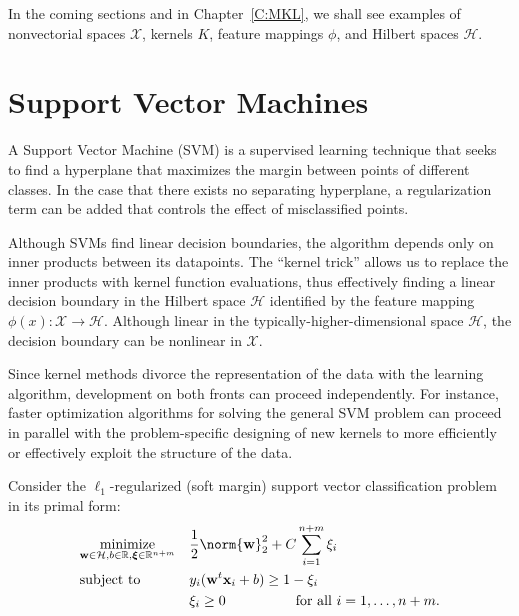 In the coming sections and in Chapter~\ref{C:MKL}, we shall see examples of
nonvectorial spaces $\mathcal{X}$, kernels $K$, feature mappings $\phi$, and
Hilbert spaces $\mathcal{H}$.

\section{Support Vector Machines}
A Support Vector Machine (SVM) \cite{cortes1995support} is a supervised learning
technique that seeks to find a hyperplane that maximizes the margin between
points of different classes.  In the case that there exists no separating
hyperplane, a regularization term can be added that controls the effect of
misclassified points.

Although SVMs find linear decision boundaries,
the algorithm depends only on inner products between its datapoints.  The
``kernel trick'' \cite{aizerman1964theoretical} allows us to replace the
inner products with kernel function evaluations, thus effectively finding
a linear decision boundary in the Hilbert space $\mathcal{H}$ identified by
the feature mapping $\phi(x): \mathcal{X} \to \mathcal{H}$.  Although linear
in the typically-higher-dimensional space $\mathcal{H}$, the decision boundary
can be nonlinear in $\mathcal{X}$.

Since kernel methods divorce the representation of the data with the learning
algorithm, development on both fronts can proceed independently.  For instance,
faster optimization algorithms for solving the general SVM problem can proceed
in parallel with the problem-specific designing of new kernels to more efficiently
or effectively exploit the structure of the data.

Consider the $\ell_1$-regularized (soft margin) support vector classification
problem \cite{scholkopf2002learning} in its primal form:
\begin{equation}
\label{eq:l1-svm-primal}
\begin{aligned}
& \underset{\mathbf{w} \in \mathcal{H}, b \in \mathbb{R}, {\boldsymbol \xi} \in \mathbb{R}^{n+m}}{\text{minimize}}
& &\frac{1}{2}\norm{\mathbf{w}}_2^2+C\sum_{i=1}^{n+m} \xi_i \\
& \text{subject to}
& & y_i(\mathbf{w}^t \mathbf{x}_i + b) \geq 1 - \xi_i \\
&&& \xi_i \geq 0 \qquad \qquad \quad \text{for all } i=1,\ldots,n+m.
\end{aligned}
\end{equation}

